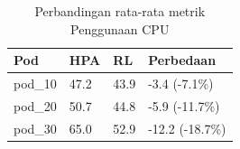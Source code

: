 \begin{table}[ht]
  \centering
  \caption{Perbandingan rata-rata metrik Penggunaan CPU}\label{tab:deskriptif-cpu}
  \begin{tabular}{llll}
    \toprule
    Pod & HPA & RL & Perbedaan \\
    \midrule
    pod\_10 & 47.2 & 43.9 & -3.4 (-7.1\%) \\
    pod\_20 & 50.7 & 44.8 & -5.9 (-11.7\%) \\
    pod\_30 & 65.0 & 52.9 & -12.2 (-18.7\%) \\
    \bottomrule
  \end{tabular}
\end{table}
